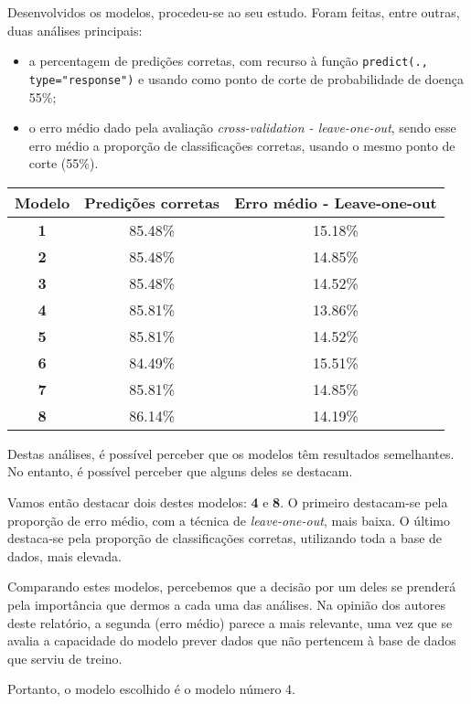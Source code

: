 \documentclass[a4paper]{report}
\begin{document}
{	Desenvolvidos os modelos, procedeu-se ao seu estudo. Foram feitas, entre outras, duas análises principais:
	\begin{itemize}
		\item a percentagem de predições corretas, com recurso à função \lstinline|predict(., type="response")| e usando como ponto de corte de probabilidade de doença 55\%;
		\item o erro médio dado pela avaliação \textit{cross-validation - leave-one-out}, sendo esse erro médio a proporção de classificações corretas, usando o mesmo ponto de corte (55\%).
	\end{itemize}
	\begin{center}
		\begin{tabular}{ | c | c | c | }
		\hline
		\textbf{Modelo} & \textbf{Predições corretas} & \textbf{Erro médio - Leave-one-out} \\ 
		\hline
		\textbf{1} & 85.48\% & 15.18\% \\ 
		\hline
		\textbf{2} & 85.48\% & 14.85\% \\
		\hline
		\textbf{3} & 85.48\% & 14.52\% \\
		\hline
		\textbf{4} & 85.81\% & 13.86\% \\
		\hline
		\textbf{5} & 85.81\% & 14.52\% \\
		\hline
		\textbf{6} & 84.49\% & 15.51\% \\
		\hline
		\textbf{7} & 85.81\% & 14.85\% \\
		\hline								   	
		\textbf{8} & 86.14\% & 14.19\% \\
		\hline
		\end{tabular}
	\end{center}

	Destas análises, é possível perceber que os modelos têm resultados semelhantes. No entanto, é possível perceber que alguns deles se destacam.

	Vamos então destacar dois destes modelos: \textbf{4} e \textbf{8}. O primeiro destacam-se pela proporção de erro médio, com a técnica de \textit{leave-one-out}, mais baixa.
	O último destaca-se pela proporção de classificações corretas, utilizando toda a base de dados, mais elevada.

	Comparando estes modelos, percebemos que a decisão por um deles se prenderá pela importância que dermos a cada uma das análises.
	Na opinião dos autores deste relatório, a segunda (erro médio) parece a mais relevante, uma vez que se avalia a capacidade do modelo prever dados que não pertencem à base de dados que serviu de treino.

	Portanto, o modelo escolhido é o modelo número 4.
}
\end{document}
